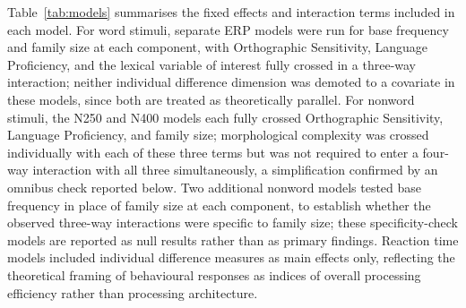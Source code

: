 \documentclass[utf8]{FrontiersinHarvard} %
\begin{document}
	Table~\ref{tab:models} summarises the fixed effects and interaction terms included in each model. For word stimuli, separate ERP models were run for base frequency and family size at each component, with Orthographic Sensitivity, Language Proficiency, and the lexical variable of interest fully crossed in a three-way interaction; neither individual difference dimension was demoted to a covariate in these models, since both are treated as theoretically parallel. For nonword stimuli, the N250 and N400 models each fully crossed Orthographic Sensitivity, Language Proficiency, and family size; morphological complexity was crossed individually with each of these three terms but was not required to enter a four-way interaction with all three simultaneously, a simplification confirmed by an omnibus check reported below. Two additional nonword models tested base frequency in place of family size at each component, to establish whether the observed three-way interactions were specific to family size; these specificity-check models are reported as null results rather than as primary findings. Reaction time models included individual difference measures as main effects only, reflecting the theoretical framing of behavioural responses as indices of overall processing efficiency rather than processing architecture.
	
\end{document}

